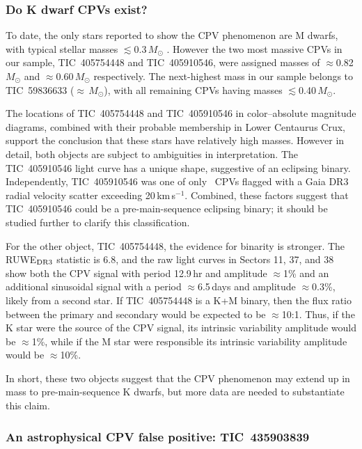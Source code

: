 \documentclass[11pt,twocolumn,tighten]{aastex63}
\newcommand{\kms}{{km\,s$^{-1}$}}
\begin{document}
\subsubsection{Do K dwarf CPVs exist?}
\label{subsec:massive}

To date, the only stars reported to show the CPV phenomenon are M
dwarfs, with typical stellar masses $\lesssim$0.3\,$M_\odot$
\citep{2017AJ....153..152S,2022AJ....163..144G}.  However the two most
massive CPVs in our sample, TIC~405754448 and TIC~405910546, were
assigned masses of $\approx$0.82\,$M_\odot$ and
$\approx$0.60\,$M_\odot$ respectively.  The next-highest mass in our
sample belongs to TIC~59836633 ($\approx$\,$M_\odot$), with all
remaining CPVs having masses $\lesssim$0.40\,$M_\odot$.

The locations of TIC~405754448 and TIC~405910546 in color--absolute
magnitude diagrams, combined with their probable membership in Lower
Centaurus Crux, support the conclusion that these stars have
relatively high masses.  However in detail, both objects are subject
to ambiguities in interpretation.  The TIC~405910546 light curve has a
unique shape, suggestive of an eclipsing binary.  Independently,
TIC~405910546 was one of only \nrvscatterflag\ CPVs flagged with a
Gaia DR3 radial velocity scatter exceeding 20\,\kms.  Combined, these
factors suggest that TIC~405910546 could be a pre-main-sequence
eclipsing binary; it should be studied further to clarify this
classification.

For the other object, TIC~405754448, the evidence for binarity is
stronger.  The RUWE$_{\rm DR3}$ statistic is 6.8, and the raw light
curves in Sectors 11, 37, and 38 show both the CPV signal with period
12.9\,hr and amplitude $\approx$1\% and an additional sinusoidal
signal with a period $\approx$6.5\,days and amplitude $\approx$0.3\%,
likely from a second star.  If TIC~405754448 is a K+M binary, then the
flux ratio between the primary and secondary would be expected to be
$\approx$10:1.  Thus, if the K star were the source of the CPV signal,
its intrinsic variability amplitude would be $\approx$1\%, while if
the M star were responsible its intrinsic variability amplitude would
be $\approx$10\%.

In short, these two objects suggest that the CPV phenomenon may extend
up in mass to pre-main-sequence K dwarfs, but more data are needed to
substantiate this claim.


\subsubsection{An astrophysical CPV false positive: TIC~435903839}
\end{document}
